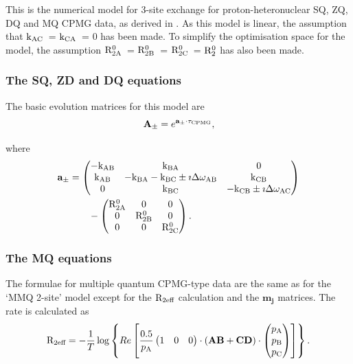 This is the numerical model for 3-site exchange for proton-heteronuclear SQ, ZQ, DQ and MQ CPMG data, as derived in \citep{Korzhnev04a,Korzhnev04b,Korzhnev05}.
As this model is linear, the assumption that $\textrm{k}_\textrm{AC}$~= $\textrm{k}_\textrm{CA}$~= 0 has been made.
To simplify the optimisation space for the model, the assumption $\mathrm{R}_\mathrm{2A}^0$~= $\mathrm{R}_\mathrm{2B}^0$~= $\mathrm{R}_\mathrm{2C}^0$~= $\mathrm{R}_2^0$ has also been made.


\subsubsection{The SQ, ZD and DQ equations}

The basic evolution matrices for this model are
\begin{equation}
    \mathbf{A_\pm} = e^{\mathbf{a_\pm} \cdot \tau_\textrm{CPMG}},
\end{equation}

where
\begin{align}
    \mathbf{a_\pm} &= \begin{pmatrix}
                        -\textrm{k}_\textrm{AB} & \textrm{k}_\textrm{BA}                          & 0    \\
                        \textrm{k}_\textrm{AB}  & -\textrm{k}_\textrm{BA} -\textrm{k}_\textrm{BC} \pm\imath\Delta\omega_\textrm{AB}    & \textrm{k}_\textrm{CB} \\
                        0     & \textrm{k}_\textrm{BC}                          & -\textrm{k}_\textrm{CB} \pm\imath\Delta\omega_\textrm{AC}
                      \end{pmatrix}  \nonumber \\
                   &\qquad - \begin{pmatrix}
                               \mathrm{R}_\mathrm{2A}^0 & 0          & 0    \\
                               0          & \mathrm{R}_\mathrm{2B}^0 & 0    \\
                               0          & 0          & \mathrm{R}_\mathrm{2C}^0
                             \end{pmatrix}.
\end{align}


\subsubsection{The MQ equations}

The formulae for multiple quantum CPMG-type data are the same as for the `MMQ 2-site' model except for the $\mathrm{R}_\textrm{2eff}$ calculation and the $\mathbf{m_j}$ matrices.
The rate is calculated as
\begin{equation}
    \mathrm{R}_\textrm{2eff} = - \frac{1}{T}
                 \log \left\{ Re \left[ \frac{0.5}{p_\textrm{A}}
                     \begin{pmatrix}1&0&0\end{pmatrix} \cdot \left( \mathbf{AB} + \mathbf{CD} \right) \cdot \begin{pmatrix}p_\textrm{A}\\p_\textrm{B}\\p_\textrm{C}\end{pmatrix}
                 \right] \right\}.
\end{equation}

